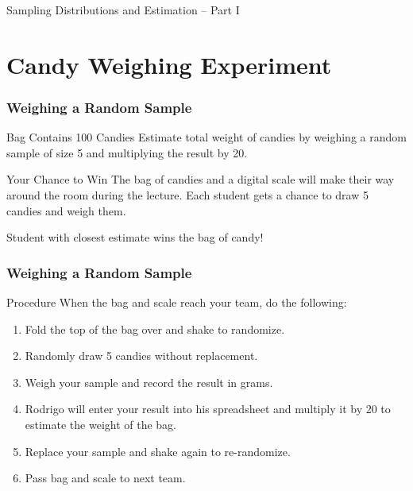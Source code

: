 \documentclass[handout]{beamer}
\date{Lecture \# 14}
\begin{document}
 


\begin{frame}[plain]
	\titlepage 
	

\end{frame} 



\begin{frame}
\begin{center}
\Huge Sampling Distributions and Estimation -- Part I
\end{center}
\end{frame}

\section{Candy Weighing Experiment}
\begin{frame}
\frametitle{Weighing a Random Sample}
\begin{block}{Bag Contains 100 Candies}
Estimate total weight of candies by weighing a random sample of size 5 and multiplying the result by 20.
\end{block}
\begin{block}{Your Chance to Win}
The bag of candies and a digital scale will make their way around the room \alert{during the lecture}. Each student gets a chance to draw 5 candies and weigh them.
\end{block}
\begin{alertblock}{Student with closest estimate wins the bag of candy!}
\end{alertblock}

\end{frame}
\begin{frame}
\frametitle{Weighing a Random Sample}
\begin{block}{Procedure}
When the bag and scale reach your team, do the following:
\end{block}
\begin{enumerate}
\item Fold the top of the bag over and shake to randomize.
\item Randomly draw 5 candies \alert{without replacement}.
\item Weigh your sample and record the result \alert{in grams}.
\item Rodrigo will enter your result into his spreadsheet and multiply it by 20 to estimate the weight of the bag.
\item Replace your sample and shake again to re-randomize.
\item Pass bag and scale to next team.
\end{enumerate}
\end{frame}
\end{document}
